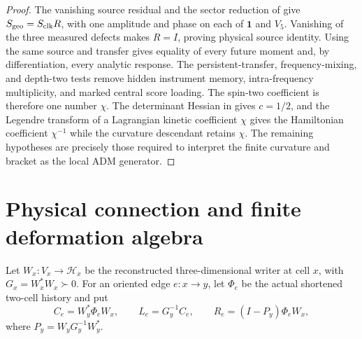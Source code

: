 \documentclass[11pt]{article}
\theoremstyle{definition}
\theoremstyle{remark}
\begin{document}
\begin{proof}
The vanishing source residual and the sector reduction of
 give
$S_{\rm geo}=S_{\rm clk}R$, with one amplitude and phase on each of
$\mathbf1$ and $V_5$.  Vanishing of the three measured defects makes $R=I$,
proving physical source identity.  Using the same source and transfer gives
equality of every future moment and, by differentiation, every analytic
response.  The persistent-transfer, frequency-mixing, and depth-two tests
remove hidden instrument memory, intra-frequency multiplicity, and marked
central score loading.  The
spin-two coefficient is therefore one number $\chi$.  The determinant Hessian
in  gives $c=1/2$, and the Legendre
transform of a Lagrangian kinetic coefficient $\chi$ gives the Hamiltonian
coefficient $\chi^{-1}$ while the curvature descendant retains $\chi$.
The remaining hypotheses are precisely those required to interpret the finite
curvature and bracket as the local ADM generator.
\end{proof}

\section{Physical connection and finite deformation algebra}
\label{sec:physical-connection-deformation}

Let $W_x:V_x\to\mathcal H_x$ be the reconstructed three-dimensional writer at
cell $x$, with $G_x=W_x^*W_x\succ0$.  For an oriented edge $e:x\to y$, let
$\Phi_e$ be the actual shortened two-cell history and put
\[
 C_e=W_y^*\Phi_eW_x,\qquad
 L_e=G_y^{-1}C_e,\qquad
 R_e=(I-P_y)\Phi_eW_x,
\]
where $P_y=W_yG_y^{-1}W_y^*$.
\end{document}
